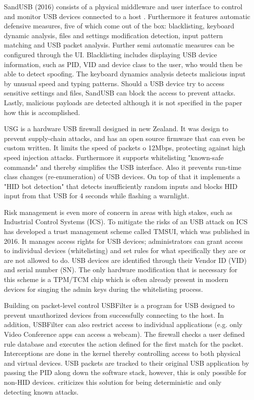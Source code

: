 SandUSB (2016) consists of a physical middleware and user interface to control and monitor USB devices connected to a host \cite{loeSandUSBInstallationfreeSandbox2016}. Furthermore it features automatic defensive measures, five of which come out of the box: blacklisting, keyboard dynamic analysis, files and settings modification detection, input pattern matching and USB packet analysis. Further semi automatic measures can be configured through the UI. 
Blacklisting includes displaying USB device information, such as PID, VID and device class to the user, who would then be able to detect spoofing. The keyboard dynamics analysis detects malicious input by unusual speed and typing patterns. Should a USB device try to access sensitive settings and files, SandUSB can block the access to prevent attacks. Lastly, malicious payloads are detected although it is not specified in the paper how this is accomplished. 

USG \cite{robertfiskRobertfiskUSG2016} is a hardware USB firewall designed in new Zealand. It was design to prevent supply-chain attacks, and has an open source firmware that can even be custom written. It limits the speed of packets o 12Mbps, protecting against high speed injection attacks. Furthermore it supports whitelisting "known-safe commands" and thereby simplifies the USB interface. Also it prevents run-time class changes (re-enumeration) of USB devices. On top of that it implements a "HID bot detection" that detects insufficiently random inputs and blocks HID input from that USB for 4 seconds while flashing a warnlight. 

Risk management is even more of concern in areas with high stakes, such as Industrial Control Systems (ICS). To mitigate the risks of an USB attack on ICS \cite{yangTMSUITrustManagement2016} has developed a trust management scheme called TMSUI, which was published in 2016. It manages access rights for USB devices; administrators can grant access to individual devices (whitelisting) and set rules for what specifically they are or are not allowed to do. USB devices are identified through their Vendor ID (VID) and serial number (SN). The only hardware modification that is necessary for this scheme is a TPM/TCM chip which is often already present in modern devices for singing the admin keys during the whitelisting process.

Building on packet-level control USBFilter \cite{tianMakingUSBGreat2016} is a program for USB designed to prevent unauthorized devices from successfully connecting to the host. In addition, USBFilter can also restrict access to individual applications (e.g. only Video Conference apps can access a webcam). The firewall checks a user defined rule database and executes the action defined for the first match for the packet. Interceptions are done in the kernel thereby controlling access to both physical and virtual devices. USB packets are tracked to their original USB application by passing the PID along down the software stack, however, this is only possible for non-HID devices.
\cite{nissimUSBbasedAttacks2017} criticizes this solution for being deterministic and only detecting known attacks. 


